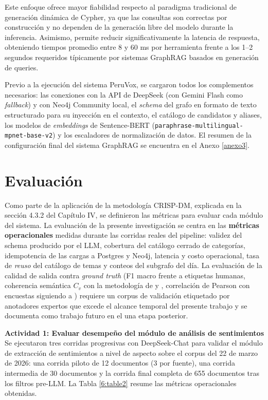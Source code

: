 Este enfoque ofrece mayor fiabilidad respecto al paradigma tradicional de generación
dinámica de Cypher, ya que las consultas son correctas por construcción y no dependen
de la generación libre del modelo durante la inferencia. Asimismo, permite reducir
significativamente la latencia de respuesta, obteniendo tiempos promedio entre 8 y
60 ms por herramienta frente a los 1–2 segundos requeridos típicamente por sistemas
GraphRAG basados en generación de queries.

Previo a la ejecución del sistema PeruVox, se cargaron todos los complementos
necesarios: las conexiones con la API de DeepSeek (con Gemini Flash como
\textit{fallback}) y con Neo4j Community local, el \textit{schema} del grafo en
formato de texto estructurado para su inyección en el contexto, el catálogo de
candidatos y aliases, los modelos de \textit{embeddings} de Sentence-BERT
(\texttt{paraphrase-multilingual-mpnet-base-v2}) y los escaladores de normalización
de datos. El resumen de la configuración final del sistema GraphRAG
se encuentra en el Anexo \ref{anexo3}.

\section{Evaluación}

Como parte de la aplicación de la metodología CRISP-DM, explicada en la sección 4.3.2
del Capítulo IV, se definieron las métricas para evaluar cada módulo del sistema. La
evaluación de la presente investigación se centra en las \textbf{métricas
operacionales} medidas durante las corridas reales del pipeline: validez del schema
producido por el LLM, cobertura del catálogo cerrado de categorías, idempotencia de
las cargas a Postgres y Neo4j, latencia y costo operacional, tasa de \textit{reuso}
del catálogo de temas y conteos del subgrafo del día. La evaluación de la calidad
de salida contra \textit{ground truth} (F1 macro frente a etiquetas humanas,
coherencia semántica $C_v$ con la metodología de
\cite{pr_mendonca2025bertopic_political} y \cite{pr_janssens2025bertopic_llm},
correlación de Pearson con encuestas siguiendo a \cite{pr_gujral2024llm_elections})
requiere un corpus de validación etiquetado por anotadores expertos que excede el
alcance temporal del presente trabajo y se documenta como trabajo futuro en el
una etapa posterior.

\vspace{0.5cm}
\textbf{Actividad 1: Evaluar desempeño del módulo de análisis de sentimientos}
\\
Se ejecutaron tres corridas progresivas con DeepSeek-Chat para validar el módulo de
extracción de sentimientos a nivel de aspecto sobre el corpus del 22 de marzo de
2026: una corrida piloto de 12 documentos (3 por fuente), una corrida intermedia de
30 documentos y la corrida final completa de 655 documentos tras los filtros
pre-LLM. La Tabla \ref{6:table2} resume las métricas operacionales obtenidas.

